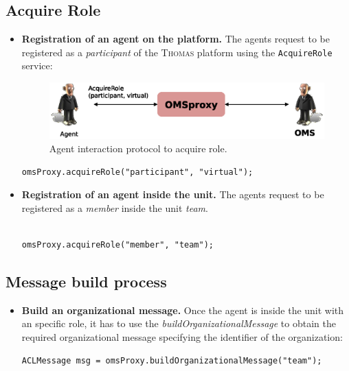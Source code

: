 \subsection{Acquire Role}
\begin{itemize}
\item \textbf{Registration of an agent on the platform.} The agents request to be registered as a \textit{participant} of the \textsc{Thomas} platform using the \lstinline|AcquireRole| service:
\begin{figure}[h!t]
	\centering
	\includegraphics[width=.8\textwidth]{Thomas/images/acquireRoleparticipant}
	\caption{Agent interaction protocol to acquire role.}
\end{figure}

\begin{lstlisting}
omsProxy.acquireRole("participant", "virtual");

\end{lstlisting}

\item \textbf{Registration of an agent inside the unit.}
The agents request to be registered as a \textit{member} inside the unit \textit{team}.


\begin{lstlisting}

omsProxy.acquireRole("member", "team");

\end{lstlisting}

\end{itemize}
\subsection{Message build process}
\begin{itemize}
\item \textbf{Build an organizational message.} Once the agent is inside the unit with an specific role, it has to use the \textit{buildOrganizationalMessage} to 
obtain the required organizational message specifying the identifier of the organization:
\begin{lstlisting}
ACLMessage msg = omsProxy.buildOrganizationalMessage("team");
\end{lstlisting}
\end{itemize}

